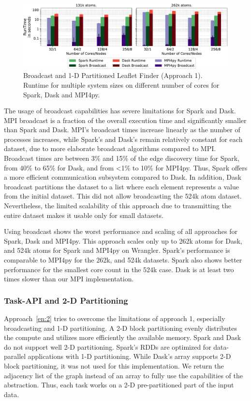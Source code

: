 \begin{figure}[t]
    \centering
    \includegraphics[width=.75\textwidth]{figures/data_analytics_hpc/task_par/spark_dask_lf_approach1.pdf}
    \caption{Broadcast and 1-D Partitioned Leaflet Finder (Approach 1). Runtime
    for multiple system sizes on different number of cores for Spark, Dask and
    MPI4py.}
    \label{fig:WranglerLeafLetFinderApp1}
\end{figure}

The usage of broadcast capabilities has severe limitations for Spark and Dask.
MPI broadcast is a fraction of the overall execution time and significantly
smaller than Spark and Dask. MPI's broadcast times increase linearly as the
number of processes increases, while Spark's and Dask's remain relatively
constant for each dataset, due to more elaborate broadcast algorithms compared
to MPI. Broadcast times are between 3\% and 15\% of the edge discovery time
for Spark, from 40\% to 65\% for Dask, and from <1\% to 10\% for MPI4py.
Thus, Spark offers a more efficient communication subsystem compared to Dask. In
addition, Dask broadcast partitions the dataset to a list where each element
represents a value from the initial dataset. This did not allow broadcasting the
524k atom dataset. Nevertheless, the limited scalability of this approach due
to transmitting the entire dataset makes it usable only for small datasets.

Using broadcast shows the worst performance and scaling of all approaches for
Spark, Dask and MPI4py. This approach scales only up to 262k atoms for Dask,
and 524k atoms for Spark and MPI4py on Wrangler. Spark's performance is
comparable to MPI4py for the 262k, and 524k datasets. Spark
also shows better performance
for the smallest core count in the 524k case. Dask is at least two times
slower than our MPI implementation.

\subsubsection*{Task-API and 2-D Partitioning}

Approach~\ref{en:2} tries to overcome the limitations of approach 1, especially
broadcasting and 1-D partitioning. A 2-D block partitioning evenly distributes 
the compute and utilizes  more efficiently the available memory. 
Spark and Dask do not support well 2-D partitioning. Spark's RDDs
are optimized for data-parallel applications with 1-D partitioning. While Dask's
array supports 2-D block partitioning, it was not used for this implementation.
We return the adjacency list of the graph instead of an array to fully use the
capabilities of the abstraction. Thus, each task works on a 2-D pre-partitioned
part of the input data.

